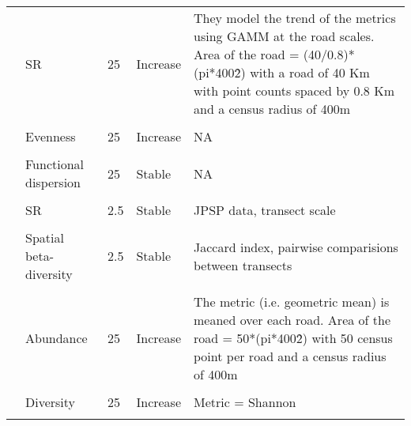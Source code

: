 \documentclass[
  12pt,
  oneside]{report}
\begin{document}
\begin{landscape}
\begin{longtable}[t]{llll>{\raggedright\arraybackslash}p{30em}}
\cite{barnagaud_temporal_2017} & SR & 25 & Increase & They model the trend of the metrics using GAMM at the road scales. Area of the road = (40/0.8)*(pi*400\^2) with a road of 40 Km with point counts spaced by 0.8 Km and a census radius of 400m\\
\cellcolor{gray!6}{\cite{barnagaud_temporal_2017}} & \cellcolor{gray!6}{Abundance} & \cellcolor{gray!6}{25} & \cellcolor{gray!6}{Decrease} & \cellcolor{gray!6}{NA}\\
\cite{barnagaud_temporal_2017} & Evenness & 25 & Increase & NA\\
\addlinespace
\cellcolor{gray!6}{\cite{barnagaud_temporal_2017}} & \cellcolor{gray!6}{Functional richness} & \cellcolor{gray!6}{25} & \cellcolor{gray!6}{Increase} & \cellcolor{gray!6}{NA}\\
\cite{barnagaud_temporal_2017} & Functional dispersion & 25 & Stable & NA\\
\cellcolor{gray!6}{\cite{barnagaud_temporal_2017}} & \cellcolor{gray!6}{Functional evenness} & \cellcolor{gray!6}{25} & \cellcolor{gray!6}{Increase} & \cellcolor{gray!6}{NA}\\
\cite{reif_changes_2013} & SR & 2.5 & Stable & JPSP data, transect scale\\
\cellcolor{gray!6}{\cite{reif_changes_2013}} & \cellcolor{gray!6}{SR} & \cellcolor{gray!6}{79000} & \cellcolor{gray!6}{Stable} & \cellcolor{gray!6}{JPSP data, national scale}\\
\addlinespace
\cite{reif_changes_2013} & Spatial beta-diversity & 2.5 & Stable & Jaccard index, pairwise comparisions between transects\\
\cellcolor{gray!6}{\cite{reif_changes_2013}} & \cellcolor{gray!6}{CSI} & \cellcolor{gray!6}{79000} & \cellcolor{gray!6}{Decrease} & \cellcolor{gray!6}{Metric = Community Specialization Index, i.e. functional diveristy index}\\
\cite{schipper_contrasting_2016} & Abundance & 25 & Increase & The metric (i.e. geometric mean) is meaned over each road. Area of the road = 50*(pi*400\^2) with 50 census point per road and a census radius of 400m\\
\cellcolor{gray!6}{\cite{schipper_contrasting_2016}} & \cellcolor{gray!6}{SR} & \cellcolor{gray!6}{25} & \cellcolor{gray!6}{Increase} & \cellcolor{gray!6}{NA}\\
\cite{schipper_contrasting_2016} & Diversity & 25 & Increase & Metric = Shannon\\
\addlinespace
\cellcolor{gray!6}{\cite{schipper_contrasting_2016}} & \cellcolor{gray!6}{Diversity} & \cellcolor{gray!6}{25} & \cellcolor{gray!6}{Increase} & \cellcolor{gray!6}{Metric = Simpson}\\

\end{longtable}
\end{landscape}
\end{document}

